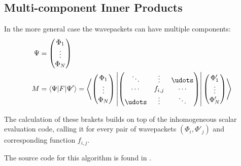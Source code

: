 \subsection{Multi-component Inner Products}

In the more general case the wavepackets can have multiple components:
\begin{align}
  \Psi &= \begin{pmatrix} \Phi_1 \\ \vdots \\ \Phi_N \end{pmatrix} \\
  M &= \langle \Psi | F | \Psi' \rangle = \left\langle
    \begin{pmatrix} \Phi_1 \\ \vdots \\ \Phi_N \end{pmatrix} \left|
    \begin{pmatrix} \ddots & \vdots & \udots \\ \cdots & f_{i,j} & \cdots \\
      \udots & \vdots & \ddots \end{pmatrix} \right|
    \begin{pmatrix} \Phi'_1 \\ \vdots \\ \Phi'_N \end{pmatrix}
    \right\rangle
\end{align}

The calculation of these brakets builds on top of the inhomogeneous scalar
evaluation code, calling it for every pair of wavepackets $(\Phi_i,\Phi'_j)$ and
corresponding function $f_{i,j}$.

The source code for this algorithm is found in
.
